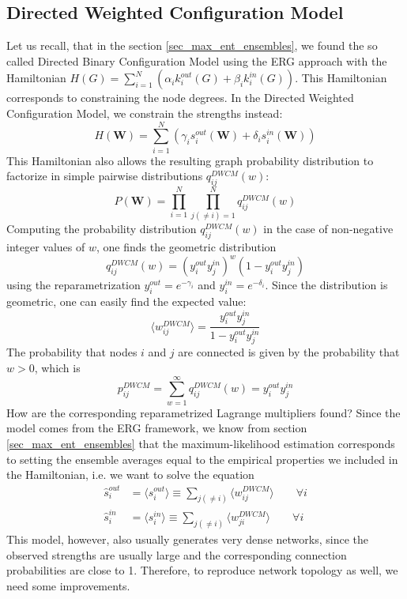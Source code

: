 \subsection{Directed Weighted Configuration Model}
Let us recall, that in the section \ref{sec_max_ent_ensembles}, we found the so called Directed Binary Configuration Model using the ERG approach with the Hamiltonian $H(G) = \sum_{i=1}^N (\alpha_ik_i^{out}(G) + \beta_i k_i^{in}(G))$. This Hamiltonian corresponds to constraining the node degrees. In the Directed Weighted Configuration Model, we constrain the strengths instead:
\begin{equation}
    H(\textbf{W}) = \sum_{i=1}^N (\gamma_i s_i^{out}(\textbf{W}) + \delta_i s_i^{in}(\textbf{W}))
\end{equation}
This Hamiltonian also allows the resulting graph probability distribution to factorize in simple pairwise distributions $q_{ij}^{DWCM}(w)$:
\begin{equation}
    P(\textbf{W}) = \prod_{i=1}^N \prod_{j(\neq i)=1}^N q_{ij}^{DWCM}(w)
    \label{eq_prob_factorization}
\end{equation}
Computing the probability distribution $q_{ij}^{DWCM}(w)$ in the case of non-negative integer values of $w$, one finds the geometric distribution
\begin{equation}
    q_{ij}^{DWCM}(w) = (y_i^{out}y_j^{in})^w(1-y_i^{out}y_j^{in}) 
\end{equation}
using the reparametrization $y_i^{out} = e^{-\gamma_i}$ and $y_i^{in} = e^{-\delta_i}$. Since the distribution is geometric, one can easily find the expected value:
\begin{equation}
    \langle w_{ij}^{DWCM} \rangle = \frac{y_i^{out}y_j^{in}}{1 - y_i^{out}y_j^{in}}
\end{equation}
The probability that nodes $i$ and $j$ are connected is given by the probability that $w > 0$, which is
\begin{equation}
    p_{ij}^{DWCM} = \sum_{w=1}^\infty  q_{ij}^{DWCM}(w) = y_i^{out}y_j^{in}
\end{equation}
How are the corresponding reparametrized Lagrange multipliers found? Since the model comes from the ERG framework, we know from section \ref{sec_max_ent_ensembles} that the maximum-likelihood estimation corresponds to setting the ensemble averages equal to the empirical properties we included in the Hamiltonian, i.e. we want to solve the equation
\begin{align}
     \hat{s}_i^{out} &= \langle s_i^{out} \rangle \equiv \sum_{j(\neq i)} \langle w_{ij}^{DWCM} \rangle \qquad \forall i \\
    \hat{s}_i^{in} &= \langle s_i^{in} \rangle \equiv \sum_{j(\neq i)} \langle w_{ji}^{DWCM} \rangle \qquad \forall i
\end{align}
This model, however, also usually generates very dense networks, since the observed strengths are usually large and the corresponding connection probabilities are close to 1. Therefore, to reproduce network topology as well, we need some improvements. 

